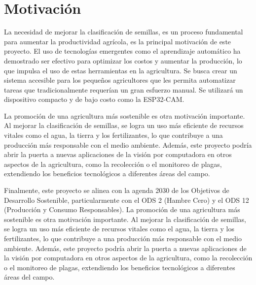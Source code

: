 \section{Motivación}

La necesidad de mejorar la clasificación de semillas, es un proceso fundamental para aumentar la productividad agrícola, es la principal motivación de este proyecto. El uso de tecnologías emergentes como el aprendizaje automático ha demostrado ser efectivo para optimizar los costos y aumentar la producción, lo que impulsa el uso de estas herramientas en la agricultura. Se busca crear un sistema accesible para los pequeños agricultores que les permita automatizar tareas que tradicionalmente requerían un gran esfuerzo manual. Se utilizará un dispositivo compacto y de bajo costo como la ESP32-CAM.

La promoción de una agricultura más sostenible es otra motivación importante. Al mejorar la clasificación de semillas, se logra un uso más eficiente de recursos vitales como el agua, la tierra y los fertilizantes, lo que contribuye a una producción más responsable con el medio ambiente. Además, este proyecto podría abrir la puerta a nuevas aplicaciones de la visión por computadora en otros aspectos de la agricultura, como la recolección o el monitoreo de plagas, extendiendo los beneficios tecnológicos a diferentes áreas del campo.

Finalmente, este proyecto se alinea con la agenda 2030 de los Objetivos de Desarrollo Sostenible, particularmente con el ODS 2 (Hambre Cero) y el ODS 12 (Producción y Consumo Responsables). La promoción de una agricultura más sostenible es otra motivación importante. Al mejorar la clasificación de semillas, se logra un uso más eficiente de recursos vitales como el agua, la tierra y los fertilizantes, lo que contribuye a una producción más responsable con el medio ambiente. Además, este proyecto podría abrir la puerta a nuevas aplicaciones de la visión por computadora en otros aspectos de la agricultura, como la recolección o el monitoreo de plagas, extendiendo los beneficios tecnológicos a diferentes áreas del campo.
